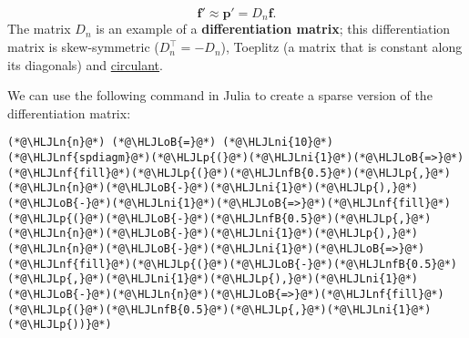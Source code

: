 \documentclass[12pt,landscape]{article}
\newcommand{\HLJLn}[1]{#1}
\newcommand{\HLJLnf}[1]{\textcolor[RGB]{66,102,213}{#1}}
\newcommand{\HLJLnfB}[1]{\textcolor[RGB]{59,151,46}{#1}}
\newcommand{\HLJLni}[1]{\textcolor[RGB]{59,151,46}{#1}}
\newcommand{\HLJLoB}[1]{\textcolor[RGB]{102,102,102}{\textbf{#1}}}
\newcommand{\HLJLp}[1]{#1}
\begin{document}
{\[
\mathbf{f}' \approx \mathbf{p}' = D_n\mathbf{f}.
\]
The matrix $D_n$ is an example of a \textbf{differentiation matrix}; this differentiation matrix is skew-symmetric ($D_n^{\top} = -D_n$), Toeplitz (a matrix that is constant along its diagonals) and \href{https://en.wikipedia.org/wiki/Circulant_matrix}{circulant}.  

We can use the following command in Julia to create a sparse version of the differentiation matrix:


\begin{lstlisting}
(*@\HLJLn{n}@*) (*@\HLJLoB{=}@*) (*@\HLJLni{10}@*)
(*@\HLJLnf{spdiagm}@*)(*@\HLJLp{(}@*)(*@\HLJLni{1}@*)(*@\HLJLoB{=>}@*)(*@\HLJLnf{fill}@*)(*@\HLJLp{(}@*)(*@\HLJLnfB{0.5}@*)(*@\HLJLp{,}@*)(*@\HLJLn{n}@*)(*@\HLJLoB{-}@*)(*@\HLJLni{1}@*)(*@\HLJLp{),}@*)(*@\HLJLoB{-}@*)(*@\HLJLni{1}@*)(*@\HLJLoB{=>}@*)(*@\HLJLnf{fill}@*)(*@\HLJLp{(}@*)(*@\HLJLoB{-}@*)(*@\HLJLnfB{0.5}@*)(*@\HLJLp{,}@*)(*@\HLJLn{n}@*)(*@\HLJLoB{-}@*)(*@\HLJLni{1}@*)(*@\HLJLp{),}@*)(*@\HLJLn{n}@*)(*@\HLJLoB{-}@*)(*@\HLJLni{1}@*)(*@\HLJLoB{=>}@*)(*@\HLJLnf{fill}@*)(*@\HLJLp{(}@*)(*@\HLJLoB{-}@*)(*@\HLJLnfB{0.5}@*)(*@\HLJLp{,}@*)(*@\HLJLni{1}@*)(*@\HLJLp{),}@*)(*@\HLJLni{1}@*)(*@\HLJLoB{-}@*)(*@\HLJLn{n}@*)(*@\HLJLoB{=>}@*)(*@\HLJLnf{fill}@*)(*@\HLJLp{(}@*)(*@\HLJLnfB{0.5}@*)(*@\HLJLp{,}@*)(*@\HLJLni{1}@*)(*@\HLJLp{))}@*)
\end{lstlisting}

}
\end{document}
